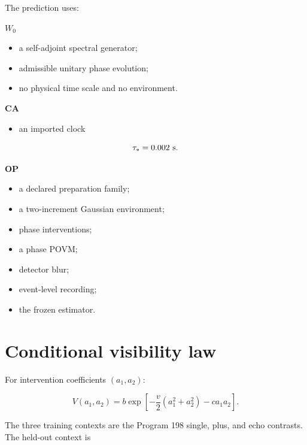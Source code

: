 \documentclass[11pt,a4paper,openany]{report}
\begin{document}
The prediction uses:

\textbf{\(W_0\)}

\begin{itemize}
\item 
a self-adjoint spectral generator;

\item 
admissible unitary phase evolution;

\item 
no physical time scale and no environment.

\end{itemize}

\textbf{CA}

\begin{itemize}
\item 
an imported clock

\end{itemize}

\[
\tau_\ast=0.002\ {\rm s}.
\]

\textbf{OP}

\begin{itemize}
\item 
a declared preparation family;

\item 
a two-increment Gaussian environment;

\item 
phase interventions;

\item 
a phase POVM;

\item 
detector blur;

\item 
event-level recording;

\item 
the frozen estimator.

\end{itemize}

\section{Conditional visibility law}

For intervention coefficients \((a_1,a_2)\):

\[
V(a_1,a_2)
=
b\exp\left[
-\frac v2(a_1^2+a_2^2)
-ca_1a_2
\right].
\]

The three training contexts are the Program 198 single, plus, and echo contrasts. The held-out context is
\end{document}
